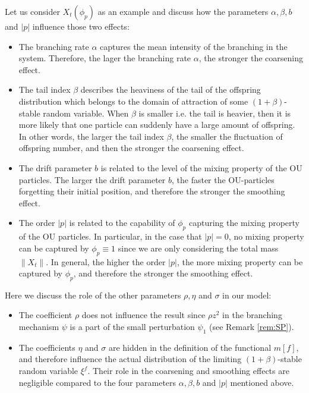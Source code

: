 \documentclass[EJP]{ejpecp} %
\begin{document}
	Let us consider $X_t(\phi_p)$ as an example and discuss how the parameters $\alpha, \beta, b$ and $|p|$ influence those two effects:
\begin{itemize}
\item
  	The branching rate $\alpha$ captures the mean intensity of the branching in the system.
  	Therefore, the lager the branching rate $\alpha$, the stronger the coarsening effect.
\item
  	The tail index $\beta$ describes the heaviness of the tail of the offspring distribution which belongs to the domain of attraction of some $(1+\beta)$-stable random variable.
	When $\beta$ is smaller i.e. the tail is heavier, then it is more likely that one particle can suddenly have a large amount of offspring.
	In other words, the larger the tail index $\beta$, the smaller the fluctuation of offspring number, and then the stronger the coarsening effect.
\item
 	The drift parameter $b$ is related to the level of the mixing property of the OU particles.
  	The larger the drift parameter $b$, the faster the OU-particles forgetting their initial position, and therefore the stronger the smoothing effect.
\item
    The order $|p|$ is related to the capability of $\phi_p$ capturing the mixing property of the OU particles.
  	In particular, in the case that $|p| = 0$, no mixing property can be captured by $\phi_p \equiv 1$ since we are only considering the total mass $\|X_t\|$.
  	In general, the higher the order $|p|$, the more mixing property can be captured by $\phi_p$, and therefore the stronger the smoothing effect.
\end{itemize}
	Here we discuss the role of the other parameters $\rho, \eta$ and $\sigma$ in our model:
\begin{itemize}
\item
  	The coefficient $\rho$ does not influence the result since $\rho z^2$ in the branching mechanism $\psi$ is a part of the small perturbation $\psi_1$ (see Remark \ref{rem:SP}).
\item
  	The coefficients $\eta$ and $\sigma$ are hidden in the definition of the functional $m[f]$, and therefore influence the actual distribution of the limiting $(1+\beta)$-stable random variable $\xi^f$.
 	Their role in the coarsening and smoothing effects are negligible compared to the four parameters $\alpha, \beta, b$ and $|p|$ mentioned above.
\end{itemize}
\end{document}
